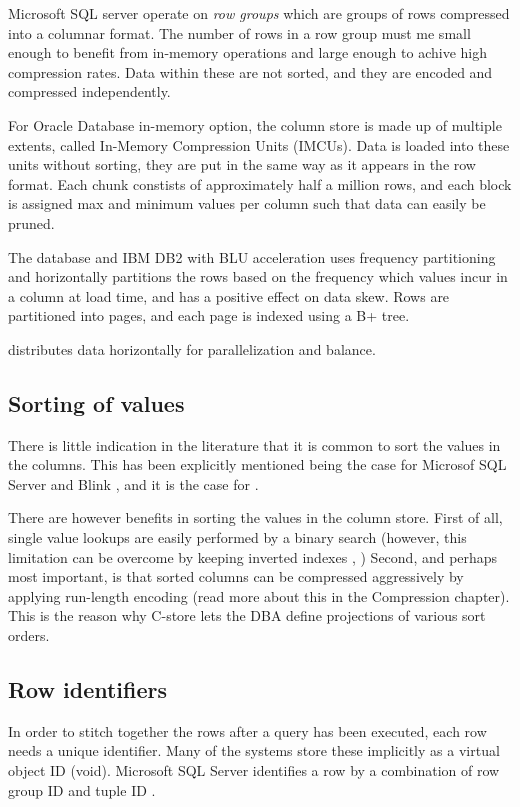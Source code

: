 Microsoft SQL server operate on \textit{row groups} which are groups of rows compressed into a columnar format. The number of rows in a row group must me small enough to benefit from in-memory operations and large enough to achive high compression rates. Data within these are not sorted, and they are encoded and compressed independently.

For Oracle Database in-memory option, the column store is made up of multiple extents, called In-Memory Compression Units (IMCUs). Data is loaded into these units without sorting, they are put in the same way as it appears in the row format. Each chunk constists of approximately half a million rows, and each block is assigned max and minimum values per column such that data can easily be pruned.

The  database and IBM DB2 with BLU acceleration  \cite{Barber2012-xt, Raman2013-em, Raman2008-gi} uses frequency partitioning and horizontally partitions the rows based on the frequency which values incur in a column at load time, and has a positive effect on data skew. Rows are partitioned into pages, and each page is indexed using a B+ tree.

 distributes data horizontally for parallelization and balance.

\subsection{Sorting of values}
\label{sub:Sorting of values}
There is little indication in the literature that it is common to sort the values in the columns. This has been explicitly mentioned being the case for Microsof SQL Server \cite{Larson2013-mc} and Blink \cite{Raman2013-em}, and it is the case for .

There are however benefits in sorting the values in the column store. First of all, single value lookups are easily performed by a binary search (however, this limitation can be overcome by keeping inverted indexes \cite{Lemke2010-is}, \cite{Schwalb2014-hn}) Second, and perhaps most important, is that sorted columns can be compressed aggressively by applying run-length encoding (read more about this in the Compression chapter). This is the reason why C-store \cite{Stonebraker2005-qz} lets the DBA define projections of various sort orders.

\subsection{Row identifiers}
\label{sub:Row identifiers}
In order to stitch together the rows after a query has been executed, each row needs a unique identifier. Many of the systems store these implicitly \cite{Boncz2002-yj, Raman2013-em, Stonebraker2005-qz, Lamb2012-kg} as a virtual object ID (void). Microsoft SQL Server identifies a row by a combination of row group ID and tuple ID \cite{Larson2013-mc}.


